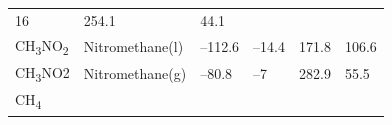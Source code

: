 \documentclass[
]{book}
\theoremstyle{definition}
\theoremstyle{definition}
\theoremstyle{definition}
\theoremstyle{remark}
\begin{document}
\begin{longtable}[]{@{}llllll@{}}
\begin{minipage}[t]{0.15\columnwidth}
16\strut
\end{minipage} & \begin{minipage}[t]{0.14\columnwidth}\raggedright
254.1\strut
\end{minipage} & \begin{minipage}[t]{0.14\columnwidth}\raggedright
44.1\strut
\end{minipage}\tabularnewline
\begin{minipage}[t]{0.07\columnwidth}\raggedright
CH\textsubscript{3}NO\textsubscript{2}\strut
\end{minipage} & \begin{minipage}[t]{0.17\columnwidth}\raggedright
Nitromethane(l)\strut
\end{minipage} & \begin{minipage}[t]{0.15\columnwidth}\raggedright
--112.6\strut
\end{minipage} & \begin{minipage}[t]{0.15\columnwidth}\raggedright
--14.4\strut
\end{minipage} & \begin{minipage}[t]{0.14\columnwidth}\raggedright
171.8\strut
\end{minipage} & \begin{minipage}[t]{0.14\columnwidth}\raggedright
106.6\strut
\end{minipage}\tabularnewline
\begin{minipage}[t]{0.07\columnwidth}\raggedright
CH\textsubscript{3}NO2\strut
\end{minipage} & \begin{minipage}[t]{0.17\columnwidth}\raggedright
Nitromethane(g)\strut
\end{minipage} & \begin{minipage}[t]{0.15\columnwidth}\raggedright
--80.8\strut
\end{minipage} & \begin{minipage}[t]{0.15\columnwidth}\raggedright
--7\strut
\end{minipage} & \begin{minipage}[t]{0.14\columnwidth}\raggedright
282.9\strut
\end{minipage} & \begin{minipage}[t]{0.14\columnwidth}\raggedright
55.5\strut
\end{minipage}\tabularnewline
\begin{minipage}[t]{0.07\columnwidth}\raggedright
CH\textsubscript{4}\strut
\end{minipage} & \begin{minipage}[t]{0.17\columnwidth}\raggedright

\end{minipage}
\end{longtable}
\end{document}
